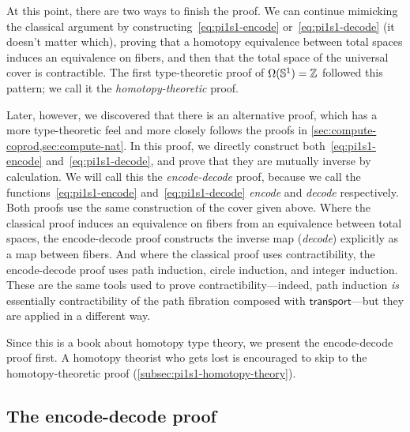 At this point, there are two ways to finish the proof.
We can continue mimicking the classical argument by constructing~\eqref{eq:pi1s1-encode} or~\eqref{eq:pi1s1-decode} (it doesn't matter which), proving that a homotopy equivalence between total spaces induces an equivalence on fibers, and then that the total space of the universal cover is contractible.
The first type-theoretic proof of $\Omega(\mathbb{S}^1)=\mathbb{Z}$ followed this pattern; we call it the \emph{homotopy-theoretic} proof.

Later, however, we discovered that there is an alternative proof, which has a more type-theoretic feel and more closely follows the proofs in \autoref{sec:compute-coprod,sec:compute-nat}.
In this proof, we directly construct both~\eqref{eq:pi1s1-encode} and~\eqref{eq:pi1s1-decode}, and prove that they are mutually inverse by calculation.
We will call this the \emph{encode-decode} proof, because we call the functions~\eqref{eq:pi1s1-encode} and~\eqref{eq:pi1s1-decode} \emph{encode} and \emph{decode} respectively.
Both proofs use the same construction of the cover given above.
Where the classical proof induces an equivalence on fibers from an equivalence between total spaces, the encode-decode proof constructs the inverse map (\emph{decode}) explicitly as a map between fibers.
And where the classical proof uses contractibility, the encode-decode proof uses path induction, circle induction, and integer induction.
These are the same tools used to prove contractibility---indeed, path induction \emph{is} essentially contractibility of the path fibration composed with $\mathsf{transport}$---but they are applied in a different way.

Since this is a book about homotopy type theory, we present the encode-decode proof first.
A homotopy theorist who gets lost is encouraged to skip to the homotopy-theoretic proof (\autoref{subsec:pi1s1-homotopy-theory}).

%
%
%

\subsection{The encode-decode proof}
\label{subsec:pi1s1-encode-decode}

